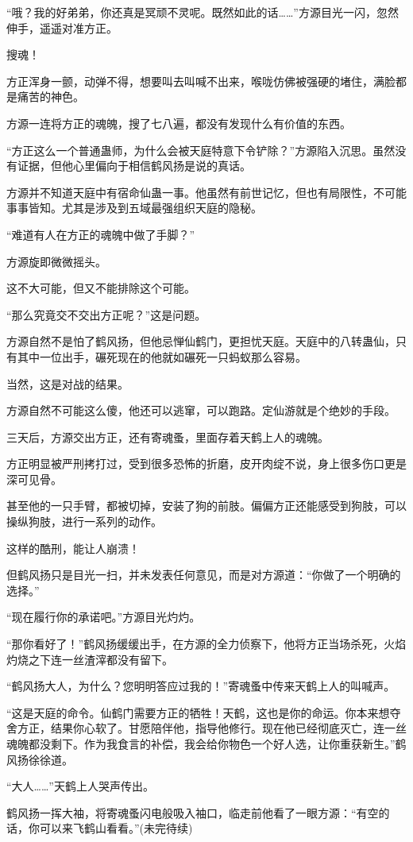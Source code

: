 \begin{this_body}
“哦？我的好弟弟，你还真是冥顽不灵呢。既然如此的话……”方源目光一闪，忽然伸手，遥遥对准方正。

搜魂！

方正浑身一颤，动弹不得，想要叫去叫喊不出来，喉咙仿佛被强硬的堵住，满脸都是痛苦的神色。

方源一连将方正的魂魄，搜了七八遍，都没有发现什么有价值的东西。

“方正这么一个普通蛊师，为什么会被天庭特意下令铲除？”方源陷入沉思。虽然没有证据，但他心里偏向于相信鹤风扬是说的真话。

方源并不知道天庭中有宿命仙蛊一事。他虽然有前世记忆，但也有局限性，不可能事事皆知。尤其是涉及到五域最强组织天庭的隐秘。

“难道有人在方正的魂魄中做了手脚？”

方源旋即微微摇头。

这不大可能，但又不能排除这个可能。

“那么究竟交不交出方正呢？”这是问题。

方源自然不是怕了鹤风扬，但他忌惮仙鹤门，更担忧天庭。天庭中的八转蛊仙，只有其中一位出手，碾死现在的他就如碾死一只蚂蚁那么容易。

当然，这是对战的结果。

方源自然不可能这么傻，他还可以逃窜，可以跑路。定仙游就是个绝妙的手段。

三天后，方源交出方正，还有寄魂蚤，里面存着天鹤上人的魂魄。

方正明显被严刑拷打过，受到很多恐怖的折磨，皮开肉绽不说，身上很多伤口更是深可见骨。

甚至他的一只手臂，都被切掉，安装了狗的前肢。偏偏方正还能感受到狗肢，可以操纵狗肢，进行一系列的动作。

这样的酷刑，能让人崩溃！

但鹤风扬只是目光一扫，并未发表任何意见，而是对方源道：“你做了一个明确的选择。”

“现在履行你的承诺吧。”方源目光灼灼。

“那你看好了！”鹤风扬缓缓出手，在方源的全力侦察下，他将方正当场杀死，火焰灼烧之下连一丝渣滓都没有留下。

“鹤风扬大人，为什么？您明明答应过我的！”寄魂蚤中传来天鹤上人的叫喊声。

“这是天庭的命令。仙鹤门需要方正的牺牲！天鹤，这也是你的命运。你本来想夺舍方正，结果你心软了。甘愿陪伴他，指导他修行。现在他已经彻底灭亡，连一丝魂魄都没剩下。作为我食言的补偿，我会给你物色一个好人选，让你重获新生。”鹤风扬徐徐道。

“大人……”天鹤上人哭声传出。

鹤风扬一挥大袖，将寄魂蚤闪电般吸入袖口，临走前他看了一眼方源：“有空的话，你可以来飞鹤山看看。”(未完待续)

\end{this_body}

